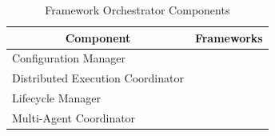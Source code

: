 \begin{table}[t]
\centering
\caption{Framework Orchestrator Components}
\vspace{-0.5em}
\label{tab:ra-framework-orchestrator}
\renewcommand{\arraystretch}{0.9}
{\scriptsize
\begin{tabular}{@{}p{2.6cm}p{5.9cm}@{}}
\toprule
\multicolumn{1}{c}{\textbf{Component}} & \multicolumn{1}{c}{\textbf{Frameworks}} \\ \midrule
Configuration Manager & \cite{mittal2025isaac} \cite{liang2018rllib} \cite{hu2022marllib} \cite{bettini2024benchmarl} \cite{dekock2023mava} \cite{castro18dopamine} \cite{tianshou}\\

Distributed Execution 
Coordinator & \cite{liang2018rllib} \cite{hoffman2020acme} \cite{hu2022marllib} \cite{dekock2023mava}\\

Lifecycle Manager & \cite{juliani2020} \cite{stable-baselines3} \cite{rl-zoo3} \cite{liang2018rllib} \cite{hoffman2020acme} \cite{hu2022marllib} \cite{bettini2024benchmarl} \cite{dekock2023mava} \cite{castro18dopamine} \cite{tianshou}\\

Multi-Agent Coordinator & \cite{terry2021pettingzoo} \cite{juliani2020} \cite{mittal2025isaac} \cite{liang2018rllib} \cite{hu2022marllib} \cite{bettini2024benchmarl} \cite{tianshou}\\

\bottomrule
\end{tabular}}
\vspace{-0.75em}
\end{table}